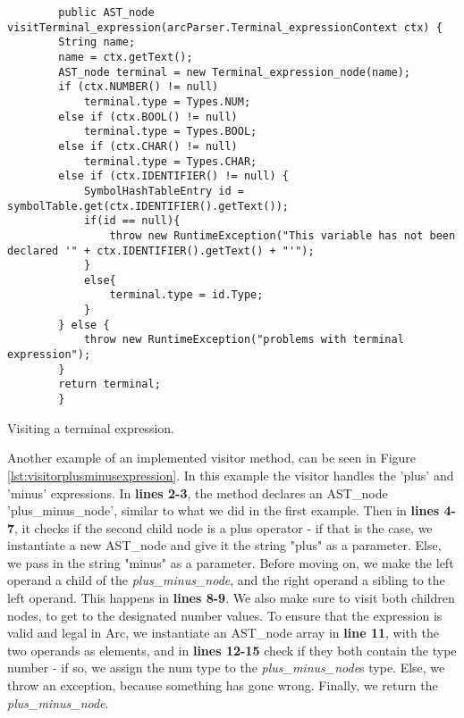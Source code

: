 \begin{listing}[htb!]
    \begin{verbatim}
        public AST_node visitTerminal_expression(arcParser.Terminal_expressionContext ctx) {
        String name;
        name = ctx.getText();
        AST_node terminal = new Terminal_expression_node(name);
        if (ctx.NUMBER() != null)
            terminal.type = Types.NUM;
        else if (ctx.BOOL() != null)
            terminal.type = Types.BOOL;
        else if (ctx.CHAR() != null)
            terminal.type = Types.CHAR;
        else if (ctx.IDENTIFIER() != null) {
            SymbolHashTableEntry id = symbolTable.get(ctx.IDENTIFIER().getText());
            if(id == null){
                throw new RuntimeException("This variable has not been declared '" + ctx.IDENTIFIER().getText() + "'");
            }
            else{
                terminal.type = id.Type;
            }
        } else {
            throw new RuntimeException("problems with terminal expression");
        }
        return terminal;
        }
    \end{verbatim}
    \caption{Visiting a terminal expression.}
    \label{lst:visitorterminalexpression}
\end{listing}

Another example of an implemented visitor method, can be seen in Figure \ref{lst:visitorplusminusexpression}. In this example the visitor handles the 'plus' and 'minus' expressions. In \textbf{lines 2-3}, the method declares an AST\_node 'plus\_minus\_node', similar to what we did in the first example. Then in \textbf{lines 4-7}, it checks if the second child node is a plus operator - if that is the case, we instantiate a new AST\_node and give it the string "plus" as a parameter. Else, we pass in the string "minus" as a parameter. Before moving on, we make the left operand a child of the \textit{plus\_minus\_node}, and the right operand a sibling to the left operand. This happens in \textbf{lines 8-9}. We also make sure to visit both children nodes, to get to the designated number values. To ensure that the expression is valid and legal in Arc, we instantiate an AST\_node array in \textbf{line 11}, with the two operands as elements, and in \textbf{lines 12-15} check if they both contain the type number - if so, we assign the num type to the \textit{plus\_minus\_node}s type. Else, we throw an exception, because something has gone wrong. Finally, we return the \textit{plus\_minus\_node}.


